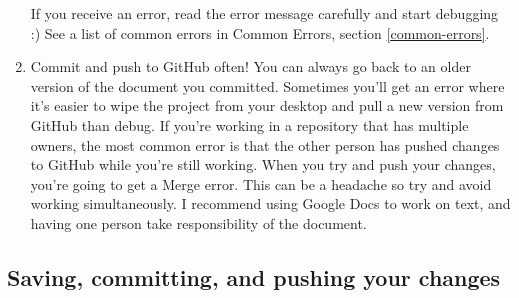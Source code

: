 \documentclass[12pt,]{article}
\begin{document}
\begin{enumerate}
  If you receive an error, read the error message carefully and start
  debugging :) See a list of common errors in Common Errors, section
  \ref{common-errors}.
\item
  Commit and push to GitHub often! You can always go back to an older
  version of the document you committed. Sometimes you'll get an error
  where it's easier to wipe the project from your desktop and pull a new
  version from GitHub than debug. If you're working in a repository that
  has multiple owners, the most common error is that the other person
  has pushed changes to GitHub while you're still working. When you try
  and push your changes, you're going to get a Merge error. This can be
  a headache so try and avoid working simultaneously. I recommend using
  Google Docs to work on text, and having one person take responsibility
  of the document.
\end{enumerate}

\subsection{Saving, committing, and pushing your
changes}\label{saving-committing-and-pushing-your-changes}
\end{document}

